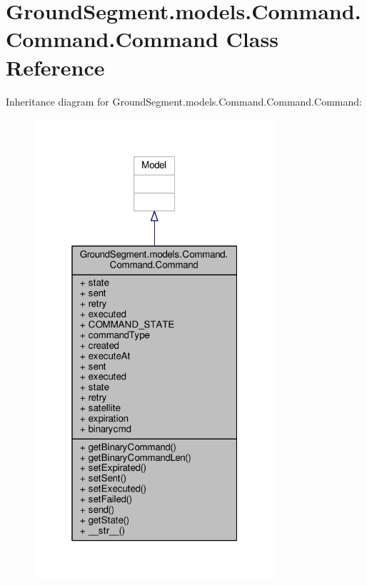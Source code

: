 \hypertarget{class_ground_segment_1_1models_1_1_command_1_1_command_1_1_command}{}\section{Ground\+Segment.\+models.\+Command.\+Command.\+Command Class Reference}
\label{class_ground_segment_1_1models_1_1_command_1_1_command_1_1_command}


Inheritance diagram for Ground\+Segment.\+models.\+Command.\+Command.\+Command\+:\nopagebreak
\begin{figure}[H]
\begin{center}
\leavevmode
\includegraphics[width=253pt]{class_ground_segment_1_1models_1_1_command_1_1_command_1_1_command__inherit__graph}
\end{center}
\end{figure}


